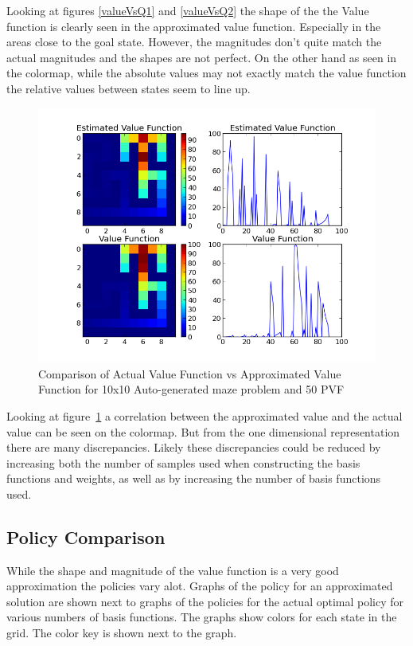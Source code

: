 \documentclass[12pt, letterpaper, final]{report}
\begin{document}
Looking at figures \ref{valueVsQ1} and \ref{valueVsQ2} the shape of
the the Value function is clearly seen in the approximated value
function. Especially in the areas close to the goal state. However,
the magnitudes don't quite match the actual magnitudes and the shapes
are not perfect. On the other hand as seen in the colormap, while the
absolute values may not exactly match the value function the relative
values between states seem to line up.

\FloatBarrier
\begin{figure}[h!]
\centering
\includegraphics[scale=.5]{images/maze01_V_comparison_k50_s5000.png}
\caption{Comparison of Actual Value Function vs Approximated Value
  Function for 10x10 Auto-generated maze problem and 50 PVF}
\label{valueVsQ3}
\end{figure}
\FloatBarrier

Looking at figure~\ref{valueVsQ3} a correlation between the
approximated value and the actual value can be seen on the
colormap. But from the one dimensional representation there are many
discrepancies. Likely these discrepancies could be reduced by
increasing both the number of samples used when constructing the basis
functions and weights, as well as by increasing the number of basis
functions used.

\subsection*{Policy Comparison}

While the shape and magnitude of the value function is a very good
approximation the policies vary alot. Graphs of the policy for an
approximated solution are shown next to graphs of the policies for the
actual optimal policy for various numbers of basis functions. The graphs show colors for each state in the
grid. The color key is shown next to the graph.
\end{document}
